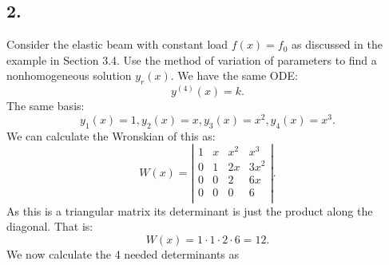 \subsection*{2.} Consider the elastic beam with constant load $f(x) = f_0$ as discussed in the example in Section 3.4. Use the method of variation of parameters to find a nonhomogeneous solution $y_r(x)$.
\bigbreak
We have the same ODE:
\[ 
y^{(4)}(x) = k
.\]
The same basis:
\[ 
y_1(x) = 1, y_2(x) = x, y_3(x) = x^2, y_4(x) = x^3
.\]
We can calculate the Wronskian of this as:
\[ 
W(x) = \left| \begin{array}{cccc}
1 & x & x^2 & x^3\\
0 & 1 & 2x & 3x^2\\
0 & 0 & 2 & 6x\\
0 & 0 & 0 & 6\\
\end{array} \right|
.\]
As this is a triangular matrix its determinant is just the product along the diagonal. That is:
\[ 
W(x) = 1\cdot 1\cdot 2\cdot 6 = 12
.\]
We now calculate the 4 needed determinants as
